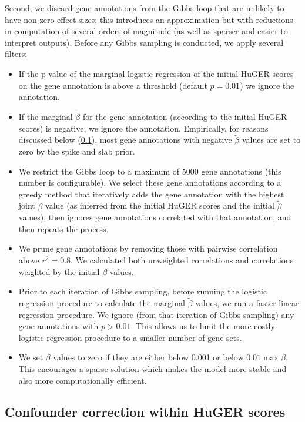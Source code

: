 {Second, we discard gene annotations from the Gibbs loop that are
unlikely to have non-zero effect sizes; this introduces an
approximation but with reductions in computation of several orders of
magnitude (as well as sparser and easier to interpret outputs). Before
any Gibbs sampling is conducted, we apply several filters:
\begin{itemize}
  \item If the p-value of the marginal logistic regression of the
    initial HuGER scores on the gene annotation is above a threshold
    (default $p=0.01$) we ignore the annotation.
  \item If the marginal $\tilde{\beta}$ for the gene annotation
    (according to the initial HuGER scores) is negative, we ignore the
    annotation. Empirically, for reasons discussed below (\ref{}),
    most gene annotations with negative $\tilde{\beta}$ values are set
    to zero by the spike and slab prior.
  \item We restrict the Gibbs loop to a maximum of $5000$ gene
    annotations (this number is configurable). We select these gene
    annotations according to a greedy method that iteratively adds the
    gene annotation with the highest joint $\beta$ value (as inferred from
    the initial HuGER scores and the initial $\tilde{\beta}$ values),
    then ignores gene annotations correlated with that annotation, and
    then repeats the process.
  \item We prune gene annotations by removing those with pairwise
    correlation above $r^2=0.8$. We calculated both unweighted
    correlations and correlations weighted by the initial $\beta$
    values.
  \item Prior to each iteration of Gibbs sampling, before running the
    logistic regression procedure to calculate the marginal
    $\tilde{\beta}$ values, we run a faster linear regression
    procedure. We ignore (from that iteration of Gibbs sampling) any
    gene annotations with $p>0.01$. This allows us to limit the more
    costly logistic regression procedure to a smaller number of gene sets.
  \item We set $\beta$ values to zero if they are either below 0.001 or
below $0.01\max{\beta}$. This encourages a sparse solution which makes
the model more stable and also more computationally efficient.

\end{itemize}

\subsection{Confounder correction within HuGER scores}

}
